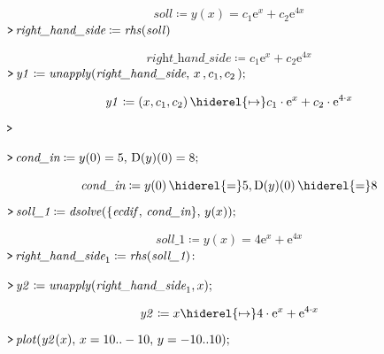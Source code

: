 \documentclass{article}
\begin{document}
\begin{dmath}\label{(21)}
\mathit{soll} \coloneqq y \! \left(x \right)=c_{1} {\mathrm e}^{x}+c_{2} {\mathrm e}^{4 x}
\end{dmath}
\mapleinput
{$ \displaystyle \texttt{>\,} \textit{right\_hand\_side} \coloneqq \mathit{rhs} (\mathit{soll}) $}

\begin{dmath}\label{(22)}
\textit{right\_hand\_side} \coloneqq c_{1} {\mathrm e}^{x}+c_{2} {\mathrm e}^{4 x}
\end{dmath}
\mapleinput
{$ \displaystyle \texttt{>\,} \mathit{y1} \coloneqq \mathit{unapply} (\textit{right\_hand\_side} ,\,x \,,c_{1},c_{2}\,); $}

\begin{dmath}\label{(23)}
\mathit{y1} \coloneqq \left(x ,c_{1},c_{2}\right)\hiderel{\mapsto }c_{1}\cdot {\mathrm e}^{x}+c_{2}\cdot {\mathrm e}^{4\cdot x}
\end{dmath}
\mapleinput
{$ \displaystyle \texttt{>\,}  $}

\mapleinput
{$ \displaystyle \texttt{>\,} \textit{cond\_in} \coloneqq y (0)=5,\,\mathrm{D}(y)(0)=8; $}

\begin{dmath}\label{(24)}
\textit{cond\_in} \coloneqq y \! \left(0\right) \hiderel{=} 5,\mathrm{D}\! \left(y \right)\! \left(0\right) \hiderel{=} 8
\end{dmath}
\mapleinput
{$ \displaystyle \texttt{>\,} \textit{soll\_1} \coloneqq \mathit{dsolve} (\{\mathit{ecdif} ,\,\textit{cond\_in} \},\,y (x)); $}

\begin{dmath}\label{(25)}
\textit{soll\_1} \coloneqq y \! \left(x \right)=4 {\mathrm e}^{x}+{\mathrm e}^{4 x}
\end{dmath}
\mapleinput
{$ \displaystyle \texttt{>\,} \textit{right\_hand\_side}_{1}\coloneqq \mathit{rhs} (\textit{soll\_1})\colon  $}

\mapleinput
{$ \displaystyle \texttt{>\,} \mathit{y2} \coloneqq \mathit{unapply} (\textit{right\_hand\_side}_{1},x); $}

\begin{dmath}\label{(26)}
\mathit{y2} \coloneqq x \hiderel{\mapsto }4\cdot {\mathrm e}^{x}+{\mathrm e}^{4\cdot x}
\end{dmath}
\mapleinput
{$ \displaystyle \texttt{>\,} \mathit{plot} (\mathit{y2} (x),\,x =10..-10,\,y =-10..10); $}
\end{document}
